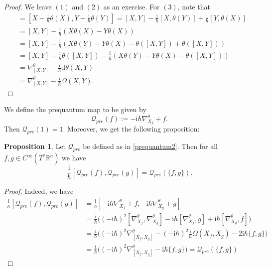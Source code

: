 \documentclass[12pt]{amsart}
\numberwithin{equation}{section}
\theoremstyle{plain}
\theoremstyle{definition}
\newtheorem{prop}{Proposition}[subsection]
\theoremstyle{remark}
\newcommand{\R}{\mathbb{R}}
\newcommand{\dd}{{\mathrm{d}}}
\newcommand{\I}{\mathrm{i}}
\begin{document}
\begin{proof}
We leave $(1)$ and $(2)$ as an exercise. For $(3)$, note that 
\begin{align*}
[\nabla^\theta_X,\nabla^\theta_Y]&=\left[X-\frac{\I}{\hbar}\theta(X),Y-\frac{\I}{\hbar}\theta(Y)\right]=[X,Y]-\frac{\I}{\hbar}[X,\theta(Y)]+\frac{\I}{\hbar}[Y,\theta(X)]\\
&=[X,Y]-\frac{\I}{\hbar}(X\theta(X)-Y\theta(X))\\
&=[X,Y]-\frac{\I}{\hbar}(X\theta(Y)-Y\theta(X)-\theta([X,Y])+\theta([X,Y]))\\
&=[X,Y]-\frac{\I}{\hbar}\theta([X,Y])-\frac{\I}{\hbar}(X\theta(Y)-Y\theta(X)-\theta([X,Y]))\\
&=\nabla^\theta_{[X,Y]}-\frac{\I}{\hbar}\dd\theta(X,Y)\\
&=\nabla^\theta_{[X,Y]}-\frac{\I}{\hbar}\Omega(X,Y).
\end{align*}
\end{proof}

We define the prequantum map to be given by  
\begin{equation}
\label{prequantum2}
\mathscr{Q}_{pre}(f):=-\I\hbar\nabla_{X_f}^\theta+f. 
\end{equation}
Then $\mathscr{Q}_{pre}(1)=1$. Moreover, we get the following proposition:

\begin{prop}
Let $\mathscr{Q}_{pre}$ be defined as in \eqref{prequantum2}. Then for all $f,g\in C^\infty(T^*\R^n)$ we have
\[
\frac{\I}{\hbar}[\mathscr{Q}_{pre}(f),\mathscr{Q}_{pre}(g)]=\mathscr{Q}_{pre}(\{f,g\}).
\]
\end{prop}

\begin{proof}
Indeed, we have 
\begin{align*}
\frac{\I}{\hbar}[\mathscr{Q}_{pre}(f),\mathscr{Q}_{pre}(g)]&=\frac{\I}{\hbar}[-\I\hbar\nabla^\theta_{X_f}+f,-\I\hbar \nabla^\theta_{X_g}+g]\\
&=\frac{\I}{\hbar}\Big((-\I\hbar)^2[\nabla^\theta_{X_f},\nabla^\theta_{X_g}]-\I\hbar[\nabla^\theta_{X_f},g]+\I\hbar[\nabla^\theta_{X_g},f]\Big)\\
&=\frac{\I}{\hbar}\Big((-\I\hbar)^2\nabla^\theta_{[X_f,X_g]}-(-\I\hbar)^2\frac{\I}{\hbar}\Omega(X_f,X_g)-2\I\hbar\{f,g\}\Big)\\
&=\frac{\I}{\hbar}\Big((-\I\hbar)^2\nabla^\theta_{[X_f,X_g]}-\I\hbar\{f,g\}\Big)=\mathscr{Q}_{pre}(\{f,g\})
\end{align*}
\end{proof}
\end{document}
